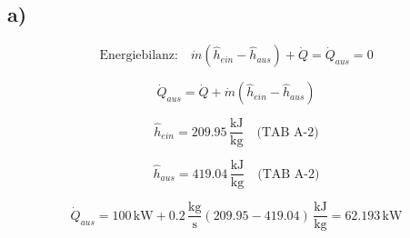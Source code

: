 

\subsection*{a)}

\[
\text{Energiebilanz:} \quad \dot{m} (\hat{h}_{ein} - \hat{h}_{aus}) + \dot{Q} = \dot{Q}_{aus} = 0
\]

\[
\dot{Q}_{aus} = \dot{Q} + \dot{m} (\hat{h}_{ein} - \hat{h}_{aus})
\]

\[
\hat{h}_{ein} = 209.95 \, \frac{\text{kJ}}{\text{kg}} \quad \text{(TAB A-2)}
\]

\[
\hat{h}_{aus} = 419.04 \, \frac{\text{kJ}}{\text{kg}} \quad \text{(TAB A-2)}
\]

\[
\dot{Q}_{aus} = 100 \, \text{kW} + 0.2 \, \frac{\text{kg}}{\text{s}} (209.95 - 419.04) \, \frac{\text{kJ}}{\text{kg}} = 62.193 \, \text{kW}
\]